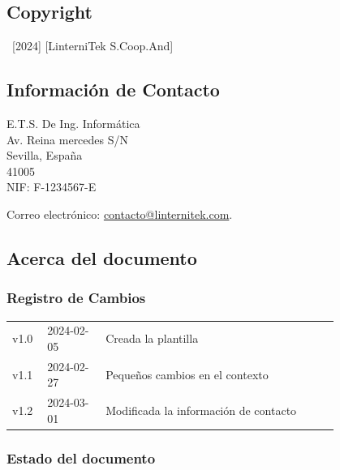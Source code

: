 \documentclass[
	a4paper, %
	12pt, %
]{CSSullivanBusinessReport}
\begin{document}
\begin{twothirdswidth} %
	\footnotesize %
	
	
	\subsection*{Copyright}
	
	\textcopyright~[2024] [LinterniTek S.Coop.And] 
	
	\subsection*{Información de Contacto}
	E.T.S. De Ing. Informática\\
	Av. Reina mercedes S/N\\
    Sevilla, España\\
	41005\\
	
	NIF: F-1234567-E
	
	Correo electrónico: \href{mailto:contacto@linternitek.com}{contacto@linternitek.com}.
	
	\vfill %
	\subsection*{Acerca del documento}
	\subsubsection*{Registro de Cambios}
	
	\scriptsize %
	
	\begin{tabular}{@{} L{0.05\linewidth} L{0.15\linewidth} L{0.6\linewidth} @{}} %
		\toprule %
		v1.0 & 2024-02-05 & Creada la plantilla \\
		v1.1 & 2024-02-27 &  Pequeños cambios en el contexto\\ 
		v1.2 & 2024-03-01 & Modificada la información de contacto\\
		\bottomrule
	\end{tabular}
    \subsubsection*{Estado del documento}
    \scriptsize
      

\end{twothirdswidth}
\end{document}
